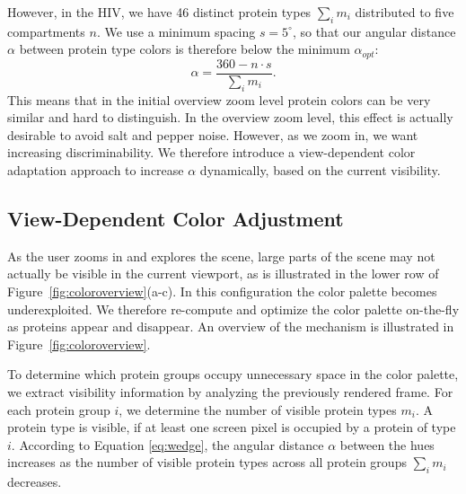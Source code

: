 \documentclass{egpubl}
\begin{document}
	However, in the HIV, we have 46 distinct protein types $\sum_{i} m_i$ distributed to five compartments $n$. 
	We use a minimum spacing $s=5^{\circ}$, so that our angular distance  $\alpha$ between protein type colors is therefore below the minimum $\alpha_{opt}$: 
	\begin{equation}%
	\alpha= \frac{360  - n \cdot s}{\sum_{i} m_i}. %
	\label{eq:wedge}%
	\end{equation}%
	This means that in the initial overview zoom level protein colors can be very similar and hard to distinguish. 
	In the overview zoom level, this effect is actually desirable to avoid salt and pepper noise. 
	However, as we zoom in, we want increasing discriminability. 
	We therefore introduce a view-dependent color adaptation approach to increase $\alpha$ dynamically, based on the current visibility.  %
	
	\subsection{View-Dependent Color Adjustment}
	\label{sec:dynamic}
	
	As the user zooms in and explores the scene, large parts of the scene may not actually be visible in the current viewport, as is illustrated in the lower row of Figure~\ref{fig:coloroverview}(a-c).
	In this configuration the color palette becomes underexploited. %
	We therefore re-compute and optimize the color palette on-the-fly as proteins appear and disappear.
	An overview of the mechanism is illustrated in Figure~\ref{fig:coloroverview}.
	
	
	To determine which protein groups occupy unnecessary space in the color palette, we extract visibility information by analyzing the previously rendered frame.
	For each protein group $i$, we determine the number of visible protein types $m_i$. 
	A protein type is visible, if at least one screen pixel is occupied by a protein of type $i$. 
	According to Equation \ref{eq:wedge}, the angular distance $\alpha$ between the hues increases as the number of visible protein types across all protein groups $\sum_{i} m_i$ decreases. 
	
\end{document}
